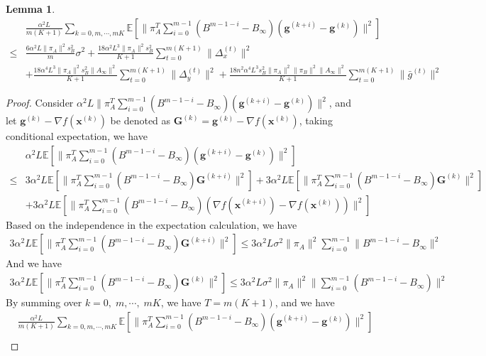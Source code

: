 \documentclass{article}
\newtheorem{lemma}[thm]{Lemma}
\newcommand{\vg}{{\mathbf{g}}}
\newcommand{\vx}{{\mathbf{x}}}
\newcommand{\EE}[1]{\mathbb{E}\left[#1\right]}
\newcommand{\norm}[1]{\| #1 \|}
\begin{document}
\begin{lemma}
  \begin{align*}
    &\frac{\alpha^2L}{m(K+1)}\sum_{k=0,m,\cdots,mK}\EE{\norm{\pi_A^{T}\sum_{i=0}^{m-1}(B^{m-1-i}-B_{\infty})(\vg^{(k+i)}-\vg^{(k)})}^2}\\
    \leq& \frac{6\alpha^2L\norm{\pi_A}^2s_B^2}{m}\sigma^2+\frac{18\alpha^2L^3\norm{\pi_A}^2s_B^2}{ K+1}\sum_{t=0}^{m(K+1)}\norm{\Delta_x^{(t)}}^2\\&+\frac{18\alpha^4L^3\norm{\pi_A}^2s_B^2\norm{A_{\infty}}^2}{ K+1}\sum_{t=0}^{m(K+1)}\norm{\Delta_y^{(t)}}^2+\frac{18n^2\alpha^4L^3s_B^2\norm{\pi_A}^2\norm{\pi_B}^2\norm{A_{\infty}}^2}{ K+1}\sum_{t=0}^{m(K+1)}\norm{\bar{g}^{(t)}}^2
  \end{align*}
\end{lemma}

\begin{proof}
  Consider $\alpha^2L\norm{\pi_A^{T}\sum_{i=0}^{m-1}(B^{m-1-i}-B_{\infty})(\vg^{(k+i)}-\vg^{(k)})}^2$, and let $\vg^{(k)}-\nabla f(\vx^{(k)})$ be denoted as $\mathbf{G}^{(k)}=\vg^{(k)}-\nabla f(\vx^{(k)})$, taking conditional expectation, we have
  \begin{align*}
    &\alpha^2L\EE{\norm{\pi_A^{T}\sum_{i=0}^{m-1}(B^{m-1-i}-B_{\infty})(\vg^{(k+i)}-\vg^{(k)})}^2}\\ 
    \leq &3\alpha^2L\EE{\norm{\pi_A^{T}\sum_{i=0}^{m-1}(B^{m-1-i}-B_{\infty})\mathbf{G}^{(k+i)}}^2}+3\alpha^2L\EE{\norm{\pi_A^{T}\sum_{i=0}^{m-1}(B^{m-1-i}-B_{\infty})\mathbf{G}^{(k)}}^2}\\&+3\alpha^2L\EE{\norm{\pi_A^{T}\sum_{i=0}^{m-1}(B^{m-1-i}-B_{\infty})(\nabla f(\vx^{(k+i)})-\nabla f(\vx^{(k)}))}^2}
  \end{align*}
  Based on the independence in the expectation calculation, we have 
  \begin{align*}
    3\alpha^2L\EE{\norm{\pi_A^{T}\sum_{i=0}^{m-1}(B^{m-1-i}-B_{\infty})\mathbf{G}^{(k+i)}}^2}\leq 3\alpha^2L\sigma^2\norm{\pi_A}^2\sum_{i=0}^{m-1}\norm{B^{m-1-i}-B_{\infty}}^2
  \end{align*}
  And we have
  \begin{align*}
    3\alpha^2L\EE{\norm{\pi_A^{T}\sum_{i=0}^{m-1}(B^{m-1-i}-B_{\infty})\mathbf{G}^{(k)}}^2}\leq 3\alpha^2L\sigma^2 \norm{\pi_A}^2\norm{\sum_{i=0}^{m-1}(B^{m-1-i}-B_{\infty})}^2
  \end{align*}
  By summing over $k=0,\;m,\cdots,\;mK$, we have $T=m(K+1)$, and we have
  \begin{align*}
    &\frac{\alpha^2L}{m(K+1)}\sum_{k=0,m,\cdots,mK}\EE{\norm{\pi_A^{T}\sum_{i=0}^{m-1}(B^{m-1-i}-B_{\infty})(\vg^{(k+i)}-\vg^{(k)})}^2}\\ 

\end{align*}
\end{proof}
\end{document}
